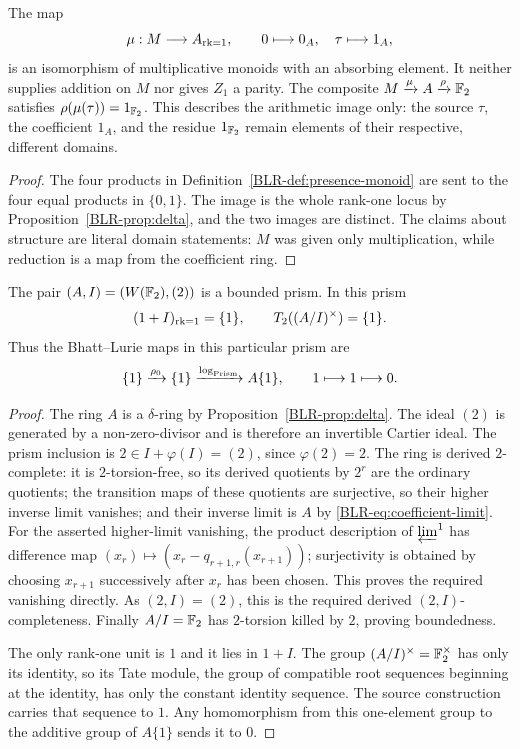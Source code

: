 \begin{theorem}\label{BLR-thm:presence-rank-one}
The map
\[
 \mu:M\longrightarrow A_{\mathrm{rk}=1},\qquad 0\longmapsto0_A,
 \quad\tau\longmapsto1_A,
\]
is an isomorphism of multiplicative monoids with an absorbing element.
It neither supplies addition on $M$ nor gives $Z_1$ a parity.
The composite $M\xrightarrow{\mu}A\xrightarrow{\rho}\mathbb F_2$ satisfies
$\rho(\mu(\tau))=1_{\mathbb F_2}$. This describes the arithmetic image only:
the source $\tau$, the coefficient $1_A$, and the residue $1_{\mathbb F_2}$
remain elements of their respective, different domains.
\end{theorem}
\begin{proof}
The four products in Definition~\ref{BLR-def:presence-monoid} are sent to
the four equal products in $\{0,1\}$. The image is the whole rank-one
locus by Proposition~\ref{BLR-prop:delta}, and the two images are distinct.
The claims about structure are literal domain statements: $M$ was given
only multiplication, while reduction is a map from the coefficient ring.
\end{proof}

\begin{proposition}\label{BLR-prop:base-prism}
The pair $(A,I)=(W(\mathbb F_2),(2))$ is a bounded prism. In this prism
\[
 (1+I)_{\mathrm{rk}=1}=\{1\},\qquad
 T_2((A/I)^\times)=\{1\}.
\]
Thus the Bhatt--Lurie maps in this particular prism are
\[
 \{1\}\xrightarrow{\rho_0}\{1\}
 \xrightarrow{\log_{\mathrm{Prism}}}A\{1\},
 \qquad 1\longmapsto1\longmapsto0.
\]
\end{proposition}
\begin{proof}
The ring $A$ is a $\delta$-ring by Proposition~\ref{BLR-prop:delta}.
The ideal $(2)$ is generated by a non-zero-divisor and is therefore an
invertible Cartier ideal. The prism inclusion is
$2\in I+\varphi(I)=(2)$, since $\varphi(2)=2$.
The ring is derived $2$-complete: it is $2$-torsion-free, so its derived
quotients by $2^r$ are the ordinary quotients; the transition maps of
these quotients are surjective, so their higher inverse limit vanishes;
and their inverse limit is $A$ by \eqref{BLR-eq:coefficient-limit}.
For the asserted higher-limit vanishing, the product description of
$\varprojlim^1$ has difference map
$(x_r)\mapsto(x_r-q_{r+1,r}(x_{r+1}))$; surjectivity is obtained by
choosing $x_{r+1}$ successively after $x_r$ has been chosen. This proves
the required vanishing directly. As $(2,I)=(2)$, this is the required
derived $(2,I)$-completeness. Finally $A/I=\mathbb F_2$ has $2$-torsion killed
by $2$, proving boundedness.

The only rank-one unit is $1$ and it lies in $1+I$.
The group $(A/I)^\times=\mathbb F_2^\times$ has only its identity, so its
Tate module, the group of compatible root sequences beginning at the
identity, has only the constant identity sequence. The source construction
carries that sequence to $1$. Any homomorphism from this one-element
group to the additive group of $A\{1\}$ sends it to $0$.
\end{proof}

